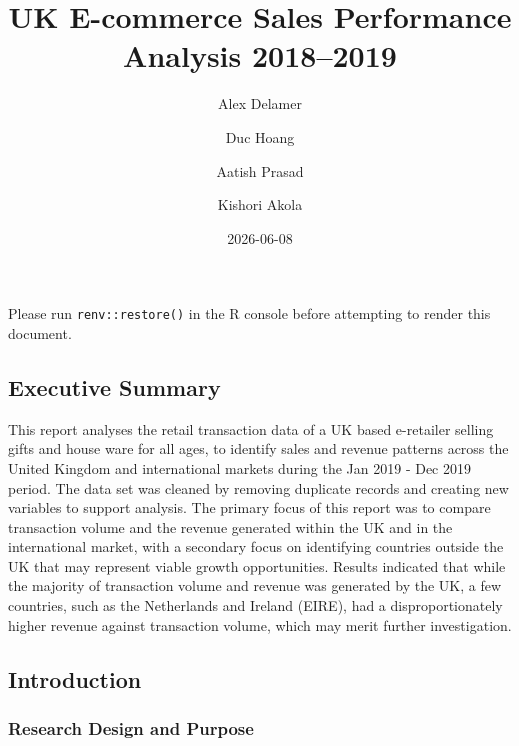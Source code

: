 \documentclass[
  letterpaper,
  DIV=11,
  numbers=noendperiod]{scrartcl}
\title{UK E-commerce Sales Performance Analysis 2018--2019}
\author{Alex Delamer \and Duc Hoang \and Aatish Prasad \and Kishori
Akola}
\date{2026-06-08}
\renewcommand*\contentsname{Table of contents}
\newcommand\contentsname{Table of contents}
\begin{document}
\maketitle

\renewcommand*\contentsname{Table of contents}
{
\setcounter{tocdepth}{3}
\tableofcontents
}

\begin{tcolorbox}[enhanced jigsaw, arc=.35mm, bottomrule=.15mm, bottomtitle=1mm, breakable, colback=white, colbacktitle=quarto-callout-important-color!10!white, colframe=quarto-callout-important-color-frame, coltitle=black, left=2mm, leftrule=.75mm, opacityback=0, opacitybacktitle=0.6, rightrule=.15mm, title=\textcolor{quarto-callout-important-color}{\faExclamation}\hspace{0.5em}{Important}, titlerule=0mm, toprule=.15mm, toptitle=1mm]

Please run \texttt{renv::restore()} in the R console before attempting
to render this document.

\end{tcolorbox}

\subsection{Executive Summary}\label{executive-summary}

This report analyses the retail transaction data of a UK based
e-retailer selling gifts and house ware for all ages, to identify sales
and revenue patterns across the United Kingdom and international markets
during the Jan 2019 - Dec 2019 period. The data set was cleaned by
removing duplicate records and creating new variables to support
analysis. The primary focus of this report was to compare transaction
volume and the revenue generated within the UK and in the international
market, with a secondary focus on identifying countries outside the UK
that may represent viable growth opportunities. Results indicated that
while the majority of transaction volume and revenue was generated by
the UK, a few countries, such as the Netherlands and Ireland (EIRE), had
a disproportionately higher revenue against transaction volume, which
may merit further investigation.

\subsection{Introduction}\label{introduction}

\subsubsection{Research Design and
Purpose}\label{research-design-and-purpose}
\end{document}
